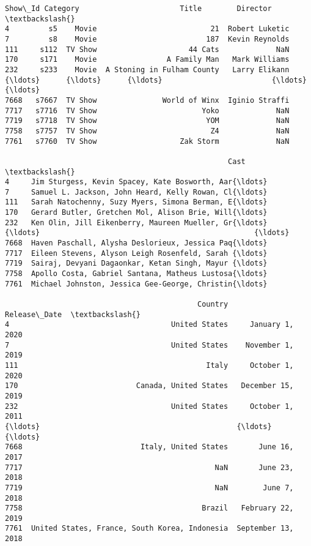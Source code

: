 \documentclass[11pt]{article}
\makeatletter
\newcommand{\boxspacing}{\kern\kvtcb@left@rule\kern\kvtcb@boxsep}
\newcommand{\prompt}[4]{
        {\ttfamily\llap{{\color{#2}[#3]:\hspace{3pt}#4}}\vspace{-\baselineskip}}
    }
\makeatother
\begin{document}
            \begin{tcolorbox}[breakable, size=fbox, boxrule=.5pt, pad at break*=1mm, opacityfill=0]
\prompt{Out}{outcolor}{60}{\boxspacing}
\begin{Verbatim}[commandchars=\\\{\}]
     Show\_Id Category                       Title        Director  \textbackslash{}
4         s5    Movie                          21  Robert Luketic
7         s8    Movie                         187  Kevin Reynolds
111     s112  TV Show                     44 Cats             NaN
170     s171    Movie                A Family Man   Mark Williams
232     s233    Movie  A Stoning in Fulham County   Larry Elikann
{\ldots}      {\ldots}      {\ldots}                         {\ldots}             {\ldots}
7668   s7667  TV Show               World of Winx  Iginio Straffi
7717   s7716  TV Show                        Yoko             NaN
7719   s7718  TV Show                         YOM             NaN
7758   s7757  TV Show                          Z4             NaN
7761   s7760  TV Show                   Zak Storm             NaN

                                                   Cast  \textbackslash{}
4     Jim Sturgess, Kevin Spacey, Kate Bosworth, Aar{\ldots}
7     Samuel L. Jackson, John Heard, Kelly Rowan, Cl{\ldots}
111   Sarah Natochenny, Suzy Myers, Simona Berman, E{\ldots}
170   Gerard Butler, Gretchen Mol, Alison Brie, Will{\ldots}
232   Ken Olin, Jill Eikenberry, Maureen Mueller, Gr{\ldots}
{\ldots}                                                 {\ldots}
7668  Haven Paschall, Alysha Deslorieux, Jessica Paq{\ldots}
7717  Eileen Stevens, Alyson Leigh Rosenfeld, Sarah {\ldots}
7719  Sairaj, Devyani Dagaonkar, Ketan Singh, Mayur {\ldots}
7758  Apollo Costa, Gabriel Santana, Matheus Lustosa{\ldots}
7761  Michael Johnston, Jessica Gee-George, Christin{\ldots}

                                            Country        Release\_Date  \textbackslash{}
4                                     United States     January 1, 2020
7                                     United States    November 1, 2019
111                                           Italy     October 1, 2020
170                           Canada, United States   December 15, 2019
232                                   United States     October 1, 2011
{\ldots}                                             {\ldots}                 {\ldots}
7668                           Italy, United States       June 16, 2017
7717                                            NaN       June 23, 2018
7719                                            NaN        June 7, 2018
7758                                         Brazil   February 22, 2019
7761  United States, France, South Korea, Indonesia  September 13, 2018


\end{Verbatim}
\end{tcolorbox}
\end{document}
